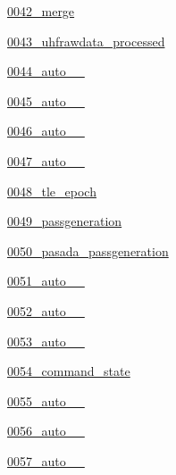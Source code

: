 \begin{DoxyCompactItemize}
 \hyperlink{namespace_ground_segment_1_1migrations_1_10042__merge}{0042\+\_\+merge}
\item 
 \hyperlink{namespace_ground_segment_1_1migrations_1_10043__uhfrawdata__processed}{0043\+\_\+uhfrawdata\+\_\+processed}
\item 
 \hyperlink{namespace_ground_segment_1_1migrations_1_10044__auto__20170206__1250}{0044\+\_\+auto\+\_\+\_}
\item 
 \hyperlink{namespace_ground_segment_1_1migrations_1_10045__auto__20170206__1323}{0045\+\_\+auto\+\_\+\_}
\item 
 \hyperlink{namespace_ground_segment_1_1migrations_1_10046__auto__20170207__1208}{0046\+\_\+auto\+\_\+\_}
\item 
 \hyperlink{namespace_ground_segment_1_1migrations_1_10047__auto__20170207__1238}{0047\+\_\+auto\+\_\+\_}
\item 
 \hyperlink{namespace_ground_segment_1_1migrations_1_10048__tle__epoch}{0048\+\_\+tle\+\_\+epoch}
\item 
 \hyperlink{namespace_ground_segment_1_1migrations_1_10049__passgeneration}{0049\+\_\+passgeneration}
\item 
 \hyperlink{namespace_ground_segment_1_1migrations_1_10050__pasada__passgeneration}{0050\+\_\+pasada\+\_\+passgeneration}
\item 
 \hyperlink{namespace_ground_segment_1_1migrations_1_10051__auto__20170313__1436}{0051\+\_\+auto\+\_\+\_}
\item 
 \hyperlink{namespace_ground_segment_1_1migrations_1_10052__auto__20170324__2213}{0052\+\_\+auto\+\_\+\_}
\item 
 \hyperlink{namespace_ground_segment_1_1migrations_1_10053__auto__20170325__1256}{0053\+\_\+auto\+\_\+\_}
\item 
 \hyperlink{namespace_ground_segment_1_1migrations_1_10054__command__state}{0054\+\_\+command\+\_\+state}
\item 
 \hyperlink{namespace_ground_segment_1_1migrations_1_10055__auto__20170327__1403}{0055\+\_\+auto\+\_\+\_}
\item 
 \hyperlink{namespace_ground_segment_1_1migrations_1_10056__auto__20170327__1906}{0056\+\_\+auto\+\_\+\_}
\item 
 \hyperlink{namespace_ground_segment_1_1migrations_1_10057__auto__20170327__1907}{0057\+\_\+auto\+\_\+\_}
\item 

\end{DoxyCompactItemize}
